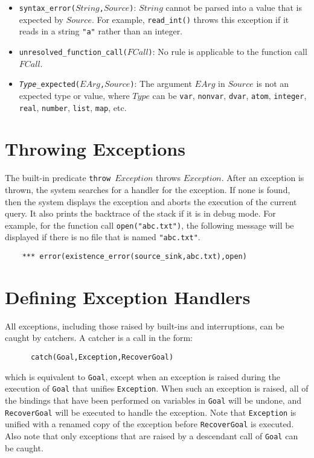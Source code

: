 \begin{itemize}
\item \texttt{syntax\_error($String$,$Source$)}: $String$ cannot be parsed into a value that is expected by $Source$. For example, \texttt{read\_int()} throws this exception if it reads in a string \texttt{"a"} rather than an integer.
\item \texttt{unresolved\_function\_call($FCall$)}: No rule is applicable to the function call $FCall$.
\item \texttt{\emph{Type}\_expected($EArg$,$Source$)}: The argument $EArg$ in $Source$ is not an expected type or value, where $Type$ can be \texttt{var}, \texttt{nonvar}, \texttt{dvar}, \texttt{atom}, \texttt{integer}, \texttt{real}, \texttt{number}, \texttt{list}, \texttt{map}, etc.
\end{itemize}

\section{Throwing Exceptions}
The built-in predicate \texttt{throw $Exception$}  throws $Exception$. After an exception is thrown, the system searches for a handler for the exception. If none is found, then the system displays the exception and aborts the execution of the current query. It also prints the backtrace of the stack if it is in debug mode. For example, for the function call \texttt{open("abc.txt")}, the following message will be displayed if there is no file that is named \texttt{"abc.txt"}.
\begin{verbatim}
    *** error(existence_error(source_sink,abc.txt),open)
\end{verbatim}

\section{Defining Exception Handlers}
All exceptions, including those raised by built-ins and interruptions, can be caught by catchers. A catcher is a call in the form:
\begin{verbatim}
      catch(Goal,Exception,RecoverGoal)
\end{verbatim}
which is equivalent to \texttt{Goal}, except when an exception is raised during the execution of \texttt{Goal} that unifies \texttt{Exception}. When such an exception is raised, all of the bindings that have been performed on variables in \texttt{Goal} will be undone, and \texttt{RecoverGoal} will be executed to handle the exception. Note that \texttt{Exception} is unified with a renamed copy of the exception before \texttt{RecoverGoal} is executed. Also note that only exceptions that are raised by a descendant call of \texttt{Goal} can be caught.


